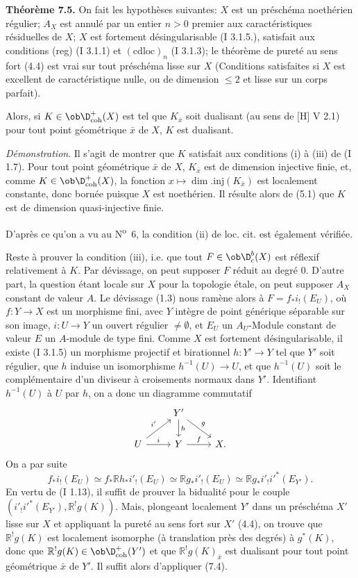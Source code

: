 \textbf{Théorème 7.5.} On fait les hypothèses suivantes: $X$ est un préschéma noethérien régulier; $A_X$ est annulé par un entier $n>0$ premier aux caractéristiques résiduelles de $X$; $X$ est fortement désingularisable (I 3.1.5.), satisfait aux conditions (reg) (I 3.1.1) et $(\mathrm{cdloc})_n$ (I 3.1.3); le théorème de pureté au sens fort (4.4) est vrai sur tout préschéma lisse sur $X$ (Conditions satisfaites si $X$ est excellent de caractéristique nulle, ou de dimension $\leq2$ et lisse sur un corps parfait).

Alors, si $K\in\ob\D^{+}_{\mathrm{coh}}(X)$ est tel que $K_{\bar{x}}$ soit dualisant (au sens de [H] V 2.1) pour tout point géométrique $\bar{x}$ de $X$, $K$ est dualisant.

\emph{Démonstration}. Il s'agit de montrer que $K$ satisfait aux conditions (i) à (iii) de (I 1.7). Pour tout point géométrique $\bar{x}$ de $X$, $K_{\bar{x}}$ est de
dimension injective finie, et, comme $K\in\ob\D^{+}_{\mathrm{coh}}(X)$, la fonction $x\mapsto \dim.\mathrm{inj}(K_{\bar{x}})$ est localement constante, donc bornée puisque $X$ est noethérien. Il résulte alors de (5.1) que $K$ est de dimension quasi-injective finie.

D'après ce qu'on a vu au N\textsuperscript{o}~6, la condition (ii) de loc. cit. est également vérifiée.

Reste à prouver la condition (iii), i.e. que tout $F\in\ob\D_c^b(X)$ est réflexif relativement à $K$. Par dévissage, on peut supposer $F$ réduit au degré $0$. D'autre part, la question étant locale sur $X$ pour la topologie étale, on peut supposer $A_X$ constant de valeur $A$. Le dévissage (1.3) nous ramène alors à $F=f_*i_!(E_U)$, où $f:Y\to X$ est un morphisme fini, avec $Y$ intègre de point générique séparable sur son image, $i:U\to Y$ un ouvert régulier $\neq\emptyset$, et $E_U$ un $A_U$-Module constant de valeur $E$ un $A$-module de type fini. Comme $X$ est fortement désingularisable, il existe (I 3.1.5) un morphisme projectif et birationnel $h:Y'\to Y$ tel que $Y'$ soit régulier, que $h$ induise un isomorphisme $h^{-1}(U)\to U$, et que $h^{-1}(U)$ soit le complémentaire d'un diviseur à croisements normaux dans $Y'$. Identifiant $h^{-1}(U)$ à $U$ par $h$, on a donc un diagramme commutatif
\[
\begin{tikzcd}
& Y' \arrow[d,"h"] \arrow[dr,"g"] & \\
U \arrow[ur,"i'"] \arrow[r,"i"] & Y \arrow[r,"f"] & X.
\end{tikzcd}
\]
On a par suite
\[
        f_*i_!(E_U)\simeq f_*\mathbb{R} h_* i'_!(E_U)\simeq \mathbb{R} g_* i'_!(E_U)\simeq \mathbb{R} g_* i'_! i'^*(E_{Y'}).
\]
En vertu de (I 1.13), il suffit de prouver la bidualité pour le couple 
$(i'_!i'^*(E_{Y'}),\mathbb{R}^!g(K))$. Mais, plongeant localement $Y'$ dans un préschéma $X'$
lisse sur $X$ et appliquant la pureté au sens fort sur $X'$ (4.4), on trouve que $\mathbb{R}^!g(K)$ est localement isomorphe (à translation près des degrés) à $g^*(K)$, donc que $\mathbb{R}^!g(K)\in\ob\D^{+}_{\mathrm{coh}}(Y')$ et que $\mathbb{R}^!g(K)_{\bar{x}}$ est dualisant pour tout point géométrique $\bar{x}$ de $Y'$. Il suffit alors d'appliquer (7.4).

